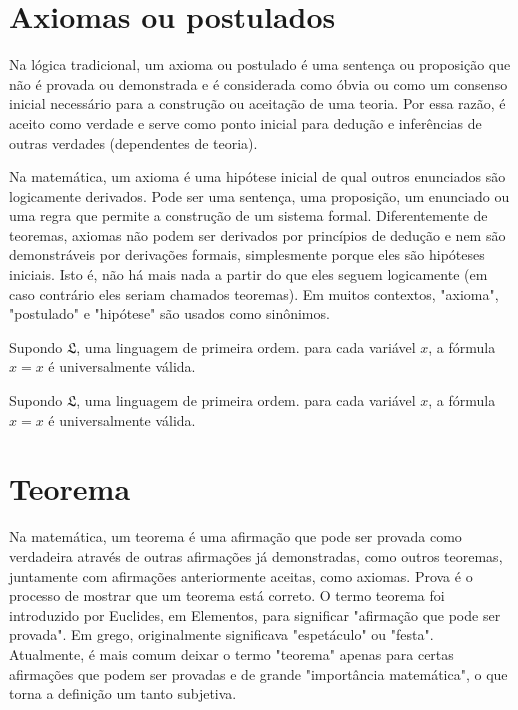 \documentclass[
	article,			%
	12pt,				%
	twoside,			%
	a4paper,			%
	english,			%
	brazil,				%
	sumario=tradicional
	]{abntex2-modelo-notas-de-aula}
\begin{document}
\clearpage
\section{Axiomas ou postulados}

Na lógica tradicional, um axioma ou postulado é uma sentença ou proposição que não é provada ou demonstrada e é considerada como óbvia ou como um consenso inicial necessário para a construção ou aceitação de uma teoria. Por essa razão, é aceito como verdade e serve como ponto inicial para dedução e inferências de outras verdades (dependentes de teoria).


Na matemática, um axioma é uma hipótese inicial de qual outros enunciados são logicamente derivados. Pode ser uma sentença, uma proposição, um enunciado ou uma regra que permite a construção de um sistema formal. Diferentemente de teoremas, axiomas não podem ser derivados por princípios de dedução e nem são demonstráveis por derivações formais, simplesmente porque eles são hipóteses iniciais. Isto é, não há mais nada a partir do que eles seguem logicamente (em caso contrário eles seriam chamados teoremas). Em muitos contextos, "axioma", "postulado" e "hipótese" são usados como sinônimos.


\begin{axioma}
	Supondo $\mathfrak{L}$, uma linguagem de primeira ordem. para cada variável $x$, a fórmula $x = x$ é universalmente válida.
\end{axioma}


\begin{postulado}
	Supondo $\mathfrak{L}$, uma linguagem de primeira ordem. para cada variável $x$, a fórmula $x = x$ é universalmente válida.
\end{postulado}


\section{Teorema}


Na matemática, um teorema é uma afirmação que pode ser provada como verdadeira através de outras afirmações já demonstradas, como outros teoremas, juntamente com afirmações anteriormente aceitas, como axiomas. Prova é o processo de mostrar que um teorema está correto. O termo teorema foi introduzido por Euclides, em Elementos, para significar "afirmação que pode ser provada". Em grego, originalmente significava "espetáculo" ou "festa". Atualmente, é mais comum deixar o termo "teorema" apenas para certas afirmações que podem ser provadas e de grande "importância matemática", o que torna a definição um tanto subjetiva.
\end{document}
